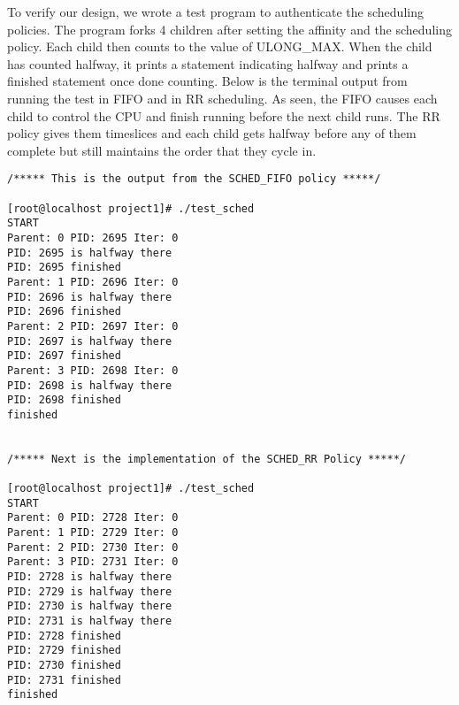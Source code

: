\documentclass[11pt,letterpaper]{article}
\begin{document}
To verify our design, we wrote a test program to authenticate the scheduling policies. The program forks 4 children after setting the affinity and the scheduling policy. Each child then counts to the value of ULONG\_MAX. When the child has counted halfway, it prints a statement indicating halfway and prints a finished statement once done counting. Below is the terminal output from running the test in FIFO and in RR scheduling. As seen, the FIFO causes each child to control the CPU and finish running before the next child runs. The RR policy gives them timeslices and each child gets halfway before any of them complete but still maintains the order that they cycle in.

\begin{verbatim}
/***** This is the output from the SCHED_FIFO policy *****/

[root@localhost project1]# ./test_sched
START
Parent: 0 PID: 2695 Iter: 0
PID: 2695 is halfway there
PID: 2695 finished
Parent: 1 PID: 2696 Iter: 0
PID: 2696 is halfway there
PID: 2696 finished
Parent: 2 PID: 2697 Iter: 0
PID: 2697 is halfway there
PID: 2697 finished
Parent: 3 PID: 2698 Iter: 0
PID: 2698 is halfway there
PID: 2698 finished
finished


/***** Next is the implementation of the SCHED_RR Policy *****/

[root@localhost project1]# ./test_sched
START
Parent: 0 PID: 2728 Iter: 0
Parent: 1 PID: 2729 Iter: 0
Parent: 2 PID: 2730 Iter: 0
Parent: 3 PID: 2731 Iter: 0
PID: 2728 is halfway there
PID: 2729 is halfway there
PID: 2730 is halfway there
PID: 2731 is halfway there
PID: 2728 finished
PID: 2729 finished
PID: 2730 finished
PID: 2731 finished
finished
\end{verbatim}
\end{document}
